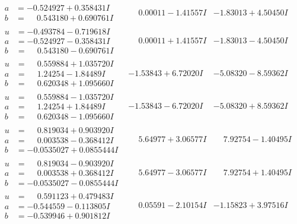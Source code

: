 \documentclass[1p]{elsarticle_modified}
\theoremstyle{definition}
\begin{document}
$$\begin{array}{c|c|c}
\begin{aligned}
a &= -0.524927 + 0.358431 I \\
b &= \phantom{-}0.543180 + 0.690761 I\end{aligned}
 & \phantom{-}0.00011 - 1.41557 I & -1.83013 + 4.50450 I \\ \hline\begin{aligned}
u &= -0.493784 - 0.719618 I \\
a &= -0.524927 - 0.358431 I \\
b &= \phantom{-}0.543180 - 0.690761 I\end{aligned}
 & \phantom{-}0.00011 + 1.41557 I & -1.83013 - 4.50450 I \\ \hline\begin{aligned}
u &= \phantom{-}0.559884 + 1.035720 I \\
a &= \phantom{-}1.24254 - 1.84489 I \\
b &= \phantom{-}0.620348 + 1.095660 I\end{aligned}
 & -1.53843 + 6.72020 I & -5.08320 - 8.59362 I \\ \hline\begin{aligned}
u &= \phantom{-}0.559884 - 1.035720 I \\
a &= \phantom{-}1.24254 + 1.84489 I \\
b &= \phantom{-}0.620348 - 1.095660 I\end{aligned}
 & -1.53843 - 6.72020 I & -5.08320 + 8.59362 I \\ \hline\begin{aligned}
u &= \phantom{-}0.819034 + 0.903920 I \\
a &= \phantom{-}0.003538 - 0.368412 I \\
b &= -0.0535027 + 0.0855444 I\end{aligned}
 & \phantom{-}5.64977 + 3.06577 I & \phantom{-}7.92754 - 1.40495 I \\ \hline\begin{aligned}
u &= \phantom{-}0.819034 - 0.903920 I \\
a &= \phantom{-}0.003538 + 0.368412 I \\
b &= -0.0535027 - 0.0855444 I\end{aligned}
 & \phantom{-}5.64977 - 3.06577 I & \phantom{-}7.92754 + 1.40495 I \\ \hline\begin{aligned}
u &= \phantom{-}0.591123 + 0.479483 I \\
a &= -0.544559 - 0.113805 I \\
b &= -0.539946 + 0.901812 I\end{aligned}
 & \phantom{-}0.05591 - 2.10154 I & -1.15823 + 3.97516 I \\ \hline\begin{aligned}

\end{aligned}
\end{array}$$
\end{document}
